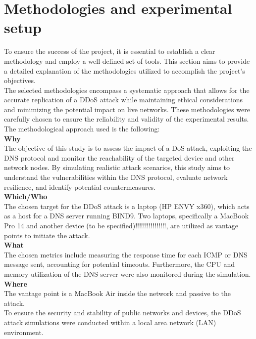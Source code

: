 \section{Methodologies and experimental setup}

To ensure the success of the project, it is essential to establish a clear methodology and employ a well-defined set of tools.
This section aims to provide a detailed explanation of the methodologies utilized to accomplish the project's objectives.\\
The selected methodologies encompass a systematic approach that allows for the accurate replication of a
DDoS attack while maintaining ethical considerations and minimizing the potential impact on live networks.
These methodologies were carefully chosen to ensure the reliability and validity of the experimental results.
The methodological approach used is the following:\\
\textbf{Why}\\
The objective of this study is to assess the impact of a DoS attack, exploiting the DNS protocol and monitor the reachability
of the targeted device and other network nodes.
By simulating realistic attack scenarios, this study aims to understand the vulnerabilities within the DNS protocol, evaluate network resilience,
and identify potential countermeasures.\\
\textbf{Which/Who}\\
The chosen target for the DDoS attack is a laptop (HP ENVY x360), which acts as a host for a DNS server running BIND9.
Two laptops, specifically a MacBook Pro 14 and another device (to be specified)!!!!!!!!!!!!!!!!, are utilized as vantage points to initiate the attack.\\
\textbf{What}\\
The chosen metrics include measuring the response time for each ICMP or DNS message sent, accounting for potential timeouts.
Furthermore, the CPU and memory utilization of the DNS server were also monitored during the simulation. \\
\textbf{Where}\\
The vantage point is a MacBook Air inside the
network and passive to the attack.\\
To ensure the security and stability of public networks and devices,
the DDoS attack simulations were conducted within a local area network (LAN) environment.
